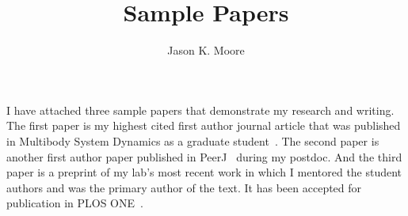 \documentclass{article}
\title{Sample Papers}
\author{Jason K. Moore}
\date{}
\begin{document}
\maketitle

I have attached three sample papers that demonstrate my research and writing.
The first paper is my highest cited first author journal article that was
published in Multibody System Dynamics as a graduate student~\cite{Moore2011c}.
The second paper is another first author paper published in
PeerJ~\cite{Moore2015b} during my postdoc. And the third paper is a preprint of
my lab's most recent work in which I mentored the student authors and was the
primary author of the text. It has been accepted for publication in PLOS
ONE~\cite{Cloud2019b}.



\end{document}
